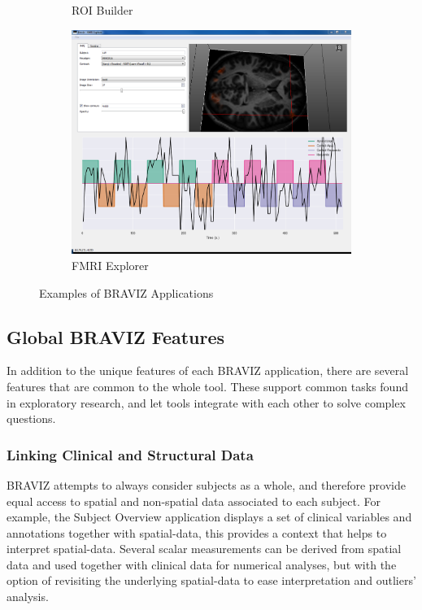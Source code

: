\documentclass[twocolumn]{svjour3}
\begin{document}
\begin{figure}
\begin{center}
\begin{subfigure}[b]{0.22\linewidth}
\caption{ROI Builder\label{fig_roi}}
\end{subfigure}\hfill
\begin{subfigure}[b]{0.18\linewidth}
\includegraphics[width=\textwidth]{figures/fmri}
\caption{FMRI Explorer\label{fig_fmri}}
\end{subfigure}
\end{center}
 \caption{\label{fig_other_apps} Examples of BRAVIZ Applications}
\end{figure}



\subsection{Global BRAVIZ Features}

In addition to the unique features of each BRAVIZ application, there are several features that are common to the whole tool. These support common tasks found in exploratory research, and let tools integrate with each other to solve complex questions.

\subsubsection{Linking Clinical and Structural Data}

BRAVIZ attempts to always consider subjects as a whole, and therefore provide equal access to spatial and non-spatial data associated to each subject. For example, the Subject Overview application displays a set of clinical variables and annotations together with spatial-data, this provides a context that helps to interpret spatial-data. Several scalar measurements can be derived from spatial data and used together with clinical data for numerical analyses, but with the option of revisiting the underlying spatial-data to ease interpretation and outliers' analysis.
\end{document}
